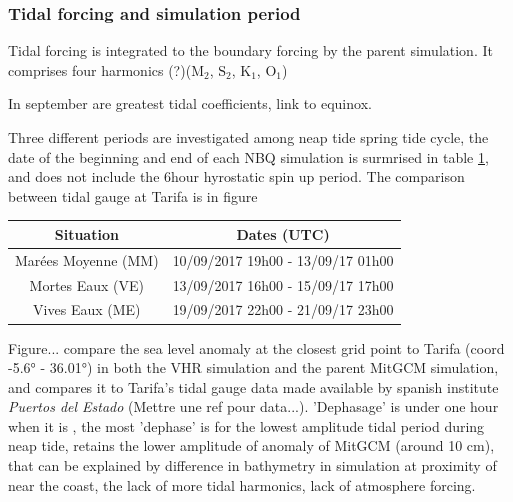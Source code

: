 \subsubsection{Tidal forcing and simulation period}
Tidal forcing is integrated to the boundary forcing by the parent simulation. It comprises four harmonics (?)($\text{M}_{\text{2}}$, $\text{S}_{\text{2}}$, $\text{K}_{\text{1}}$, $\text{O}_{\text{1}}$)

In september are greatest tidal coefficients, link to equinox.

Three different periods are investigated among neap tide spring tide cycle, the date of the beginning and end of each NBQ simulation is surmrised in table \ref{tab_dates_MIV}, and does not include the 6hour hyrostatic spin up period. The comparison between tidal gauge at Tarifa is in figure 

\begin{table}[h]
        \centering
        \begin{tabular}{|c|c|}
                \hline
                Situation & Dates (UTC)\\
                \hline
                Marées Moyenne (MM) & 10/09/2017 19h00 - 13/09/17 01h00  \\
                Mortes Eaux (VE) & 13/09/2017 16h00 - 15/09/17 17h00 \\
                Vives Eaux (ME) & 19/09/2017 22h00 - 21/09/17 23h00  \\
                \hline
        \end{tabular}
        \label{tab_dates_MIV}
\end{table}

Figure... compare the sea level anomaly at the closest grid point to Tarifa (coord -5.6° - 36.01°) in both the VHR simulation and the parent MitGCM simulation, and compares it to Tarifa's tidal gauge data made available by spanish institute \textit{Puertos del Estado} (Mettre une ref pour data...). 'Dephasage' is under one hour when it is , the most 'dephase' is for the lowest amplitude tidal period during neap tide, retains the lower amplitude of anomaly of MitGCM (around 10 cm), that can be explained by difference in bathymetry in simulation at proximity of near the coast, the lack of more tidal harmonics, lack of atmosphere forcing.

